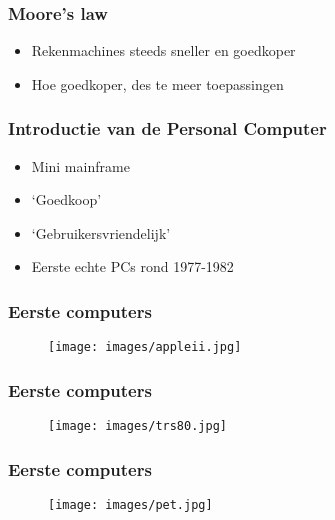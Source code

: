 \documentclass[aspectratio=43]{uva-inf-presentation}
\begin{document}

\begin{frame}
\frametitle{Moore's law}

\begin{itemize}
\item Rekenmachines steeds sneller en goedkoper
\item Hoe goedkoper, des te meer toepassingen
\end{itemize}

\end{frame}


\begin{frame}
\frametitle{Introductie van de Personal Computer}

\begin{itemize}
\item Mini mainframe
\item `Goedkoop'
\item `Gebruikersvriendelijk'
\item Eerste echte PCs rond 1977-1982
\end{itemize}

\end{frame}


\begin{frame}
\frametitle{Eerste computers}

\begin{figure}
\texttt{[image: images/appleii.jpg]}
\end{figure}

\end{frame}


\begin{frame}
\frametitle{Eerste computers}

\begin{figure}
\texttt{[image: images/trs80.jpg]}
\end{figure}

\end{frame}


\begin{frame}
\frametitle{Eerste computers}

\begin{figure}
\texttt{[image: images/pet.jpg]}
\end{figure}

\end{frame}
\end{document}
